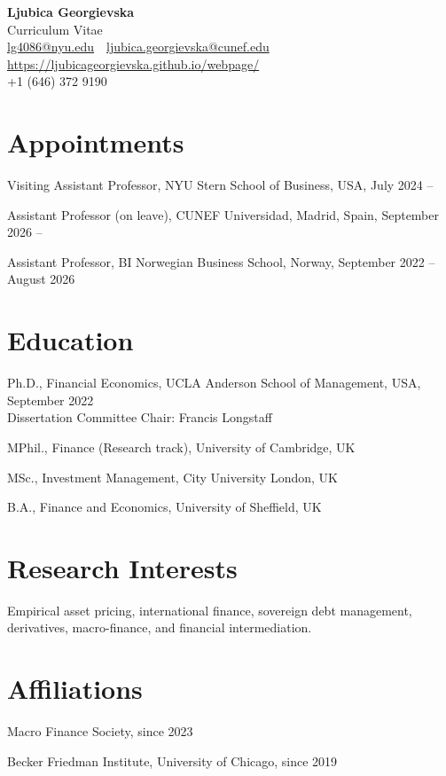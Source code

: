 \documentclass[11pt]{article}
\begin{document}
\begin{center}
    {\LARGE \textbf{Ljubica Georgievska}}\\[4pt]
    {\large Curriculum Vitae}\\[6pt]
    \href{mailto:lg4086@nyu.edu}{lg4086@nyu.edu} \,\textperiodcentered\,
    \href{mailto:ljubica.georgievska@cunef.edu}{ljubica.georgievska@cunef.edu}\\
    \url{https://ljubicageorgievska.github.io/webpage/}\\
    +1 (646) 372 9190
\end{center}

\section{Appointments}
Visiting Assistant Professor, NYU Stern School of Business, USA, July 2024 --

Assistant Professor (on leave), CUNEF Universidad, Madrid, Spain, September 2026 --

Assistant Professor, BI Norwegian Business School, Norway, September 2022 -- August 2026

\section{Education}
Ph.D., Financial Economics, UCLA Anderson School of Management, USA, September 2022\\
\hspace*{1.5em}Dissertation Committee Chair: Francis Longstaff

MPhil., Finance (Research track), University of Cambridge, UK

MSc., Investment Management, City University London, UK

B.A., Finance and Economics, University of Sheffield, UK

\section{Research Interests}
Empirical asset pricing, international finance, sovereign debt management, derivatives, macro-finance, and financial intermediation.

\section{Affiliations}
Macro Finance Society, since 2023

Becker Friedman Institute, University of Chicago, since 2019
\end{document}
